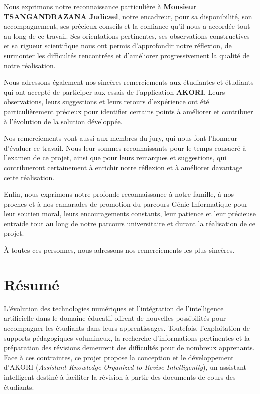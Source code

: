 \documentclass[12pt,a4paper,oneside]{report}
\begin{document}
Nous exprimons notre reconnaissance particulière à \textbf{Monsieur TSANGANDRAZANA Judicael}, notre encadreur, pour sa disponibilité, son accompagnement, ses précieux conseils et la confiance qu'il nous a accordée tout au long de ce travail. Ses orientations pertinentes, ses observations constructives et sa rigueur scientifique nous ont permis d'approfondir notre réflexion, de surmonter les difficultés rencontrées et d'améliorer progressivement la qualité de notre réalisation.

Nous adressons également nos sincères remerciements aux étudiantes et étudiants qui ont accepté de participer aux essais de l'application \textbf{AKORI}. Leurs observations, leurs suggestions et leurs retours d'expérience ont été particulièrement précieux pour identifier certains points à améliorer et contribuer à l'évolution de la solution développée.

Nos remerciements vont aussi aux membres du jury, qui nous font l'honneur d'évaluer ce travail. Nous leur sommes reconnaissants pour le temps consacré à l'examen de ce projet, ainsi que pour leurs remarques et suggestions, qui contribueront certainement à enrichir notre réflexion et à améliorer davantage cette réalisation.

Enfin, nous exprimons notre profonde reconnaissance à notre famille, à nos proches et à nos camarades de promotion du parcours Génie Informatique pour leur soutien moral, leurs encouragements constants, leur patience et leur précieuse entraide tout au long de notre parcours universitaire et durant la réalisation de ce projet.

À toutes ces personnes, nous adressons nos remerciements les plus sincères.

\chapter*{Résumé}

L'évolution des technologies numériques et l'intégration de l'intelligence artificielle dans le domaine éducatif offrent de nouvelles possibilités pour accompagner les étudiants dans leurs apprentissages. Toutefois, l'exploitation de supports pédagogiques volumineux, la recherche d'informations pertinentes et la préparation des révisions demeurent des difficultés pour de nombreux apprenants. Face à ces contraintes, ce projet propose la conception et le développement d'AKORI (\emph{Assistant Knowledge Organized to Revise Intelligently}), un assistant intelligent destiné à faciliter la révision à partir des documents de cours des étudiants.
\end{document}
